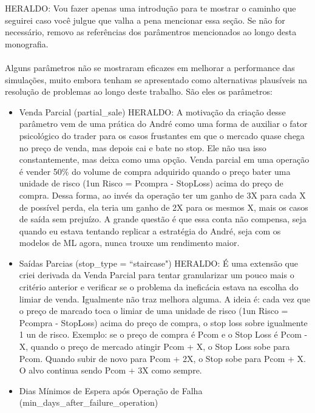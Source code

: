 \color{red} HERALDO: Vou fazer apenas uma introdução para te mostrar o caminho que seguirei caso você julgue que valha a pena mencionar essa seção. Se não for necessário, removo as referências dos parâmentros mencionados ao longo desta monografia.

\paragraph{} Alguns parâmetros não se mostraram eficazes em melhorar a performance das simulações, muito embora tenham se apresentado como alternativas plausíveis na resolução de problemas ao longo deste trabalho. São eles os parâmetros:

\begin{itemize}
    \item Venda Parcial (partial\_sale)
    \color{red} HERALDO: A motivação da criação desse parâmetro vem de uma prática do André como uma forma de auxiliar o fator psicológico do trader para os casos frustantes em que o mercado quase chega no preço de venda, mas depois cai e bate no stop. Ele não usa isso constantemente, mas deixa como uma opção. Venda parcial em uma operação é vender 50\% do volume de compra adquirido quando o preço bater uma unidade de risco (1un Risco = Pcompra - StopLoss) acima do preço de compra. Dessa forma, ao invés da operação ter um ganho de 3X para cada X de possível perda, ela teria um ganho de 2X para os mesmos X, mais os casos de saída sem prejuízo. A grande questão é que essa conta não compensa, seja quando eu estava tentando replicar a estratégia do André, seja com os modelos de ML agora, nunca trouxe um rendimento maior. 

    \item Saídas Parcias (stop\_type = ``staircase")
    \color{red} HERALDO: É uma extensão que criei derivada da Venda Parcial para tentar granularizar um pouco mais o critério anterior e verificar se o problema da ineficácia estava na escolha do limiar de venda. Igualmente não traz melhora alguma. A ideia é: cada vez que o preço de marcado toca o limiar de uma unidade de risco (1un Risco = Pcompra - StopLoss) acima do preço de compra, o stop loss sobre igualmente 1 un de risco. Exemplo: se o preço de compra é Pcom e o Stop Loss é Pcom - X, quando o preço de mercado atingir Pcom + X, o Stop Loss sobe para Pcom. Quando subir de novo para Pcom + 2X, o Stop sobe para Pcom + X. O alvo continua sendo Pcom + 3X como sempre. 

    \item Dias Mínimos de Espera após Operação de Falha (min\_days\_after\_failure\_operation)


\end{itemize}
